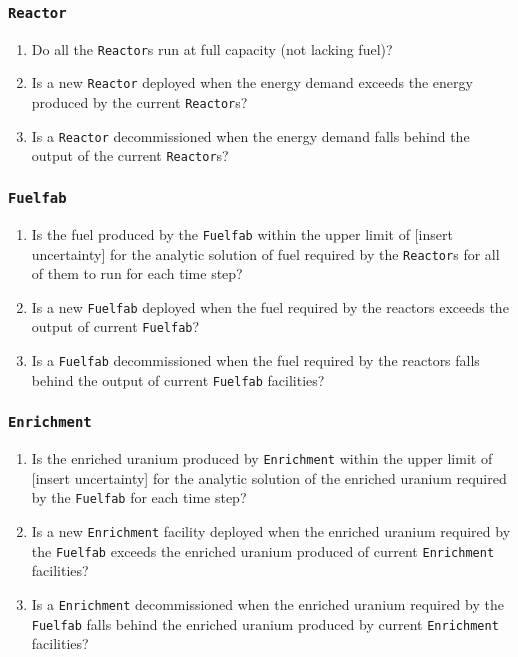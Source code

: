 \documentclass[12pt,letterpaper]{article}
\begin{document}
\subsubsection{\texttt{Reactor}}

\begin{enumerate}
\item  Do all the \texttt{Reactor}s run at full capacity (not lacking fuel)? 

\item Is a new \texttt{Reactor} deployed when the energy demand exceeds the energy produced by the current \texttt{Reactor}s? 

\item Is a \texttt{Reactor} decommissioned when the energy demand falls behind the output of the current \texttt{Reactor}s? 

\end{enumerate}

\subsubsection{\texttt{Fuelfab}}
\begin{enumerate}
\item  Is the fuel produced by the \texttt{Fuelfab} within the upper limit of [insert uncertainty] for the analytic solution of fuel required by the \texttt{Reactor}s for all of them to run for each time step? 

\item Is a new \texttt{Fuelfab} deployed when the fuel required by the reactors exceeds the output of current \texttt{Fuelfab}?

\item Is a \texttt{Fuelfab} decommissioned when the fuel required by the reactors falls behind the output of current \texttt{Fuelfab} facilities?
\end{enumerate}

\subsubsection{\texttt{Enrichment}}
\begin{enumerate}
\item  Is the enriched uranium produced by \texttt{Enrichment} within the upper limit of [insert uncertainty] for the analytic solution of the enriched uranium required by the \texttt{Fuelfab} for each time step? 

\item Is a new \texttt{Enrichment} facility deployed when the enriched uranium required by the \texttt{Fuelfab} exceeds the enriched uranium produced of current \texttt{Enrichment} facilities?

\item Is a \texttt{Enrichment} decommissioned when the enriched uranium required by the \texttt{Fuelfab} falls behind the enriched uranium produced by current \texttt{Enrichment} facilities?
\end{enumerate}
\end{document}
